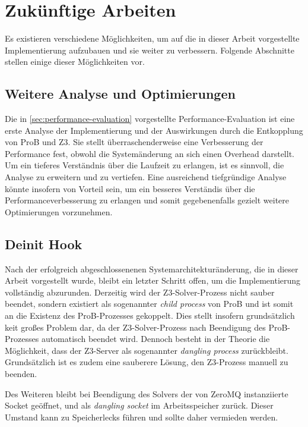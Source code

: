 

\section{Zukünftige Arbeiten}

Es existieren verschiedene Möglichkeiten, um auf die in dieser Arbeit vorgestellte Implementierung aufzubauen und sie weiter zu verbessern.
Folgende Abschnitte stellen einige dieser Möglichkeiten vor.

\subsection{Weitere Analyse und Optimierungen}

Die in \cref{sec:performance-evaluation} vorgestellte Performance-Evaluation ist eine erste Analyse der Implementierung und der Auswirkungen durch die Entkopplung von ProB und Z3.
Sie stellt überraschenderweise eine Verbesserung der Performance fest, obwohl die Systemänderung an sich einen Overhead darstellt.
Um ein tieferes Verständnis über die Laufzeit zu erlangen, ist es sinnvoll, die Analyse zu erweitern und zu vertiefen.
Eine ausreichend tiefgründige Analyse könnte insofern von Vorteil sein, um ein besseres Verständis über die Performanceverbesserung zu erlangen und somit gegebenenfalls gezielt weitere Optimierungen vorzunehmen.

\subsection{Deinit Hook}

Nach der erfolgreich abgeschlossenenen Systemarchitekturänderung, die in dieser Arbeit vorgestellt wurde,
bleibt ein letzter Schritt offen, um die Implementierung vollständig abzurunden.
Derzeitig wird der Z3-Solver-Prozess nicht sauber beendet, sondern existiert als sogenannter \textit{child process} von ProB und ist somit an die Existenz des ProB-Prozesses gekoppelt.
Dies stellt insofern grundsätzlich keit großes Problem dar, da der Z3-Solver-Prozess nach Beendigung des ProB-Prozesses automatisch beendet wird.
Dennoch besteht in der Theorie die Möglichkeit, dass der Z3-Server als sogenannter \textit{dangling process} zurückbleibt.
Grundsätzlich ist es zudem eine sauberere Lösung, den Z3-Prozess manuell zu beenden.

Des Weiteren bleibt bei Beendigung des Solvers der von ZeroMQ instanziierte Socket geöffnet, und als \textit{dangling socket} im Arbeitsspeicher zurück.
Dieser Umstand kann zu Speicherlecks führen und sollte daher vermieden werden.

